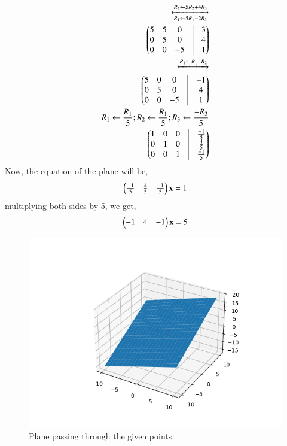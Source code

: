 \documentclass[A4,10pt,twocolumn]{IEEEtran}
\begin{document}
\begin{align}
\xleftrightarrow[R_1 \leftarrow 5R_1 - 2R_3]{R_2 \leftarrow 5R_2 + 4R_3}\\
\myvec{5&5&0&\vrule&3\\0&5&0&\vrule&4\\0&0&-5&\vrule&1}\\
\xleftrightarrow{R_1 \leftarrow R_1 - R_2}\\
\myvec{5&0&0&\vrule&-1\\0&5&0&\vrule&4\\0&0&-5&\vrule&1}\\
{R_1 \leftarrow \frac{R_1}{5}} ; {R_2 \leftarrow \frac{R_1}{5}}; {R_3 \leftarrow \frac{-R_3}{5}}\\
\myvec{1&0&0&\vrule&\frac{-1}{5}  \\ 0&1&0&\vrule&\frac{4}{5} \\0&0&1&\vrule&\frac{-1}{5}}
\end{align}
Now, the equation of the plane will be,
\begin{align}
\begin{pmatrix}\frac{-1}{5} & \frac{4}{5} & \frac{-1}{5}\end{pmatrix} \mathbf{x} = 1
\end{align}
multiplying both sides by 5, we get,
\begin{align}
\begin{pmatrix}-1 & 4 & -1 \end{pmatrix}\mathbf{x} = 5
\end{align}
\begin{figure}[h!]
  \centering
   \includegraphics[width=\columnwidth]{figs/plane_b.png}
    \caption{Plane passing through the given points }
     \label{fig:2}
     \end{figure} 
\end{document}
